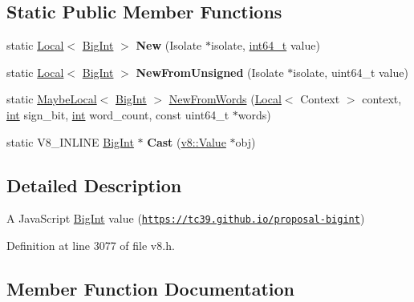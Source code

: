 \subsection*{Static Public Member Functions}
\begin{DoxyCompactItemize}
\item 
\mbox{\label{classv8_1_1BigInt_a4682f096ed12241365225df82209349d}} 
static \mbox{\hyperlink{classv8_1_1Local}{Local}}$<$ \mbox{\hyperlink{classv8_1_1BigInt}{Big\+Int}} $>$ {\bfseries New} (Isolate $\ast$isolate, \mbox{\hyperlink{classint64__t}{int64\+\_\+t}} value)
\item 
\mbox{\label{classv8_1_1BigInt_a6e8ac3390327e48bf1a3e788f9ca4324}} 
static \mbox{\hyperlink{classv8_1_1Local}{Local}}$<$ \mbox{\hyperlink{classv8_1_1BigInt}{Big\+Int}} $>$ {\bfseries New\+From\+Unsigned} (Isolate $\ast$isolate, uint64\+\_\+t value)
\item 
static \mbox{\hyperlink{classv8_1_1MaybeLocal}{Maybe\+Local}}$<$ \mbox{\hyperlink{classv8_1_1BigInt}{Big\+Int}} $>$ \mbox{\hyperlink{classv8_1_1BigInt_a89e705d9fa4f512dbce05968de727522}{New\+From\+Words}} (\mbox{\hyperlink{classv8_1_1Local}{Local}}$<$ Context $>$ context, \mbox{\hyperlink{classint}{int}} sign\+\_\+bit, \mbox{\hyperlink{classint}{int}} word\+\_\+count, const uint64\+\_\+t $\ast$words)
\item 
\mbox{\label{classv8_1_1BigInt_ad6d5b03552c5f81589d641ef2fc055d8}} 
static V8\+\_\+\+I\+N\+L\+I\+NE \mbox{\hyperlink{classv8_1_1BigInt}{Big\+Int}} $\ast$ {\bfseries Cast} (\mbox{\hyperlink{classv8_1_1Value}{v8\+::\+Value}} $\ast$obj)
\end{DoxyCompactItemize}


\subsection{Detailed Description}
A Java\+Script \mbox{\hyperlink{classv8_1_1BigInt}{Big\+Int}} value (\href{https://tc39.github.io/proposal-bigint}{\tt https\+://tc39.\+github.\+io/proposal-\/bigint}) 

Definition at line 3077 of file v8.\+h.



\subsection{Member Function Documentation}
\mbox{\label{classv8_1_1BigInt_a6478543bf9a595571d76e60fd3f2af0e}} 
